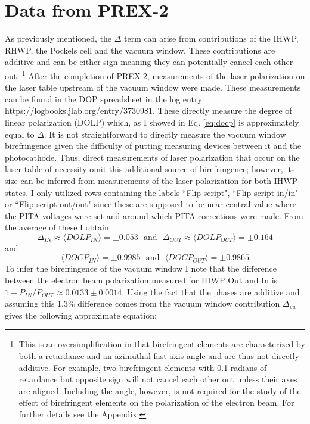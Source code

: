 \documentclass[12pt]{article}
\begin{document}
\section{Data from PREX-2}
As previously mentioned, the $\Delta$ term can arise from contributions of the IHWP, RHWP, the Pockels cell and the vacuum window. These contributions are additive and can be either sign meaning they can potentially cancel each other out. \footnote{This is an oversimplification in that birefringent elements are characterized by both a retardance and an azimuthal fast axis angle and are thus not directly additive. For example, two birefringent elements with 0.1 radians of retardance but opposite sign will not cancel each other out unless their axes are aligned. Including the angle, however, is not required for the study of the effect of birefringent elements on the polarization of the electron beam. For further details see the Appendix.} After the completion of PREX-2, measurements of the laser polarization on the laser table upstream of the vacuum window were made. These measurements can be found in the DOP spreadsheet in the log entry  https://logbooks.jlab.org/entry/3730981. These directly measure the degree of linear polarization (DOLP) which, as I showed in Eq. \ref{eq:docp} is approximately equal to $\Delta$. It is not straightforward to directly measure the vacuum window birefringence given the difficulty of putting measuring devices between it and the photocathode. Thus, direct measurements of laser polarization that occur on the laser table of necessity omit this additional source of birefringence; however, its size can be inferred from measurements of the laser polarization for both IHWP states. I only utilized rows containing the labels ``Flip script", ``Flip script in/in" or ``Flip script out/out" since these are supposed to be near central value where the PITA voltages were set and around which PITA corrections were made. From the average of these I obtain
\begin{equation}
\Delta_{IN}\approx\langle DOLP_{IN} \rangle=\pm0.053 ~~~ \textrm{and}~~~ \Delta_{OUT}\approx\langle DOLP_{OUT} \rangle=\pm0.164
\label{eq:docp_in}
\end{equation}
and
\begin{equation}
\label{eq:docp_out}
\langle DOCP_{IN} \rangle=\pm0.9985 ~~~ \textrm{and}~~~ \langle DOCP_{OUT} \rangle=\pm0.9865
\end{equation}
To infer the birefringence of the vacuum window I note that the difference between the electron beam polarization measured for IHWP Out and In is $1-P_{IN}/P_{OUT}\approx 0.0133\pm0.0014.$ Using the fact that the phases are additive and assuming this 1.3\% difference comes from the vacuum window contribution $\Delta_{vw}$ gives the following approximate equation:
\end{document}
